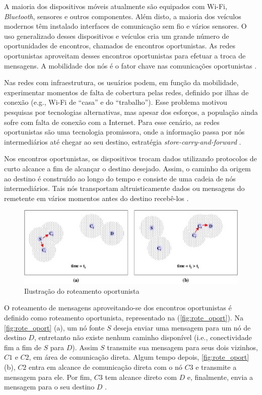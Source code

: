 \documentclass[mestrado, pre-defesa, english, brazil]{packages/icmc}
\begin{document}
A maioria dos dispositivos móveis atualmente são equipados com Wi-Fi, \textit{Bluetooth}, sensores e outros componentes. Além disto, a maioria dos veículos modernos têm instalado interfaces de comunicação sem fio e vários sensores. O uso generalizado desses dispositivos e veículos cria um grande número de oportunidades de encontros, chamados de encontros oportunistas. As redes oportunistas aproveitam desses encontros oportunistas para efetuar a troca de mensagens. A mobilidade dos nós é o fator chave nas comunicações oportunistas \cite{Khalid-2012}.

Nas redes com infraestrutura, os usuários podem, em função da mobilidade, experimentar momentos de falta de cobertura pelas redes, definido por ilhas de conexão (e.g., Wi-Fi de ``casa'' e do ``trabalho''). Esse problema motivou pesquisas por tecnologias alternativas, mas apesar dos esforços, a população ainda sofre com falta de conexão com a Internet. Para esse cenário, as redes oportunistas são uma tecnologia promissora, onde a informação passa por nós intermediários até chegar ao seu destino, estratégia \textit{store-carry-and-forward} \cite{Pond-2013}.

Nos encontros oportunistas, os dispositivos trocam dados utilizando protocolos de curto alcance a fim de alcançar o destino desejado. Assim, o caminho da origem ao destino é construído ao longo do tempo e consiste de uma cadeia de nós intermediários. Tais nós transportam altruisticamente dados ou mensagens do remetente em vários momentos antes do destino recebê-los \cite{Sastry-2011}.

\begin{figure}[!htbp]
    \centering
    \caption{\label{fig:rote_oport} Ilustração do roteamento oportunista}
    \includegraphics[width=16cm]{img/roteamento.jpeg}
\end{figure}

O roteamento de mensagens aproveitando-se dos encontros oportunistas é definido como roteamento oportunista, representado na (\autoref{fig:rote_oport}). Na \autoref{fig:rote_oport} (a), um nó fonte $S$ deseja enviar uma mensagem para um nó de destino $D$, entretanto não existe nenhum caminho disponível (i.e., conectividade fim a fim de $S$ para $D$). Assim $S$ transmite sua mensagem para seus dois vizinhos, $C1$ e $C2$, em área de comunicação direta. Algum tempo depois, \autoref{fig:rote_oport} (b), $C2$ entra em alcance de comunicação direta com o nó $C3$ e transmite a mensagem para ele. Por fim, $C3$ tem alcance direto com $D$ e, finalmente, envia a mensagem para o seu destino $D$ \cite{Vahdat-2000}.
\end{document}
